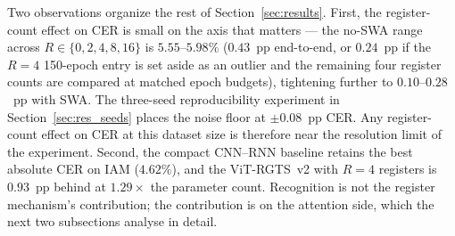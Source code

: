 \begin{table}[t]
\centering
\small
\caption{Best result per architecture family. IAM and READ2016 rows are directly comparable within each dataset; parameter counts explain the size--accuracy trade-off.}
\label{tab:arch_comparison}
\end{table}

Two observations organize the rest of Section~\ref{sec:results}. First, the register-count effect on CER is small on the axis that matters --- the no-SWA range across $R \in \{0, 2, 4, 8, 16\}$ is $5.55$--$5.98\%$ ($0.43$~pp end-to-end, or $0.24$~pp if the $R = 4$ 150-epoch entry is set aside as an outlier and the remaining four register counts are compared at matched epoch budgets), tightening further to $0.10$--$0.28$~pp with SWA. The three-seed reproducibility experiment in Section~\ref{sec:res_seeds} places the noise floor at $\pm 0.08$~pp CER. Any register-count effect on CER at this dataset size is therefore near the resolution limit of the experiment. Second, the compact CNN--RNN baseline retains the best absolute CER on IAM ($4.62\%$), and the ViT-RGTS~v2 with $R = 4$ registers is $0.93$~pp behind at $1.29 \times$ the parameter count. Recognition is not the register mechanism's contribution; the contribution is on the attention side, which the next two subsections analyse in detail.

